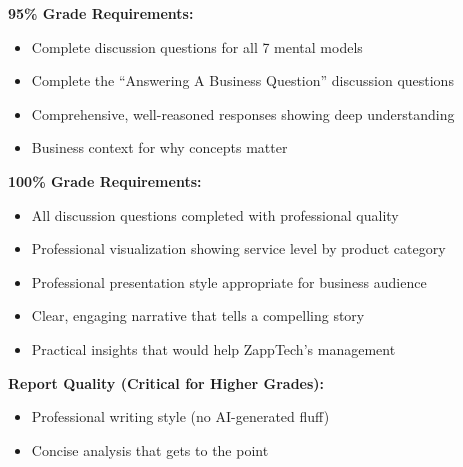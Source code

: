 \documentclass[
]{article}
\providecommand{\tightlist}{%
  \setlength{\itemsep}{0pt}\setlength{\parskip}{0pt}}
\begin{document}
\textbf{95\% Grade Requirements:}

\begin{itemize}
\tightlist
\item[$\square$]
  Complete discussion questions for all 7 mental models
\item[$\square$]
  Complete the ``Answering A Business Question'' discussion questions
\item[$\square$]
  Comprehensive, well-reasoned responses showing deep understanding
\item[$\square$]
  Business context for why concepts matter
\end{itemize}

\textbf{100\% Grade Requirements:}

\begin{itemize}
\tightlist
\item[$\square$]
  All discussion questions completed with professional quality
\item[$\square$]
  Professional visualization showing service level by product category
\item[$\square$]
  Professional presentation style appropriate for business audience
\item[$\square$]
  Clear, engaging narrative that tells a compelling story
\item[$\square$]
  Practical insights that would help ZappTech's management
\end{itemize}

\textbf{Report Quality (Critical for Higher Grades):}

\begin{itemize}
\tightlist
\item[$\square$]
  Professional writing style (no AI-generated fluff)
\item[$\square$]
  Concise analysis that gets to the point
\end{itemize}
\end{document}
